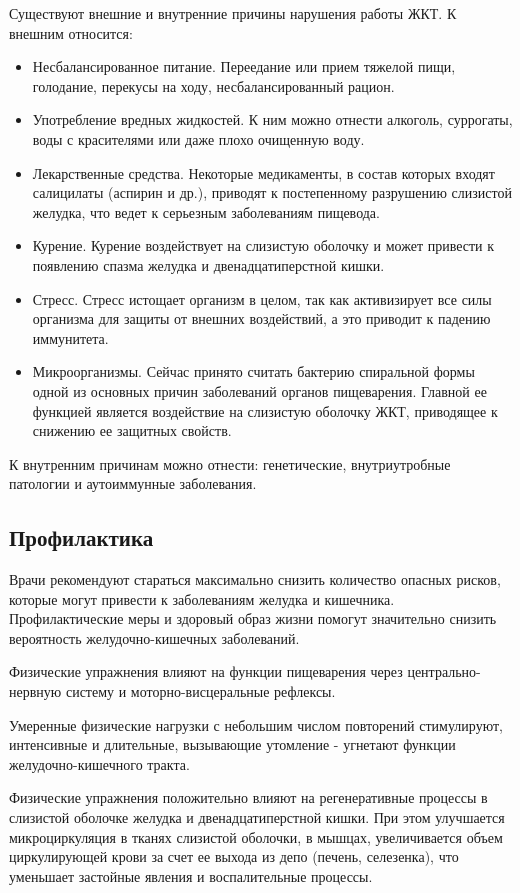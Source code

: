 \documentclass[a4paper]{article}
\begin{document}
    Существуют внешние и внутренние причины нарушения работы ЖКТ. К внешним относится:
    \begin{itemize}
        \item Несбалансированное питание. Переедание или прием тяжелой пищи, голодание, перекусы на ходу, несбалансированный рацион.
        \item Употребление вредных жидкостей. К ним можно отнести алкоголь, суррогаты, воды с красителями или даже плохо очищенную воду.
        \item Лекарственные средства. Некоторые медикаменты, в состав которых входят салицилаты (аспирин и др.), приводят к постепенному разрушению слизистой желудка, что ведет к серьезным заболеваниям пищевода.
        \item Курение. Курение воздействует на слизистую оболочку и может привести к появлению спазма желудка и двенадцатиперстной кишки. 
        \item Стресс. Стресс истощает организм в целом, так как активизирует все силы организма для защиты от внешних воздействий, а это приводит к падению иммунитета.
        \item Микроорганизмы.  Сейчас принято считать бактерию спиральной формы одной из основных причин заболеваний органов пищеварения. Главной ее функцией является воздействие на слизистую оболочку ЖКТ, приводящее к снижению ее защитных свойств.
    \end{itemize}

    К внутренним причинам можно отнести: генетические, внутриутробные патологии и аутоиммунные заболевания.

    \subsection{Профилактика}

    Врачи рекомендуют стараться максимально снизить количество опасных рисков, которые могут привести к заболеваниям желудка и кишечника. Профилактические меры и здоровый образ жизни помогут значительно снизить вероятность желудочно-кишечных заболеваний.

    Физические упражнения влияют на функции пищеварения через центрально-нервную систему и моторно-висцеральные рефлексы.

    Умеренные физические нагрузки с небольшим числом повторений стимулируют, интенсивные и длительные, вызывающие утомление - угнетают функции желудочно-кишечного тракта.

    Физические упражнения положительно влияют на регенеративные процессы в слизистой оболочке желудка и двенадцатиперстной кишки. При этом улучшается микроциркуляция в тканях слизистой оболочки, в мышцах, увеличивается объем циркулирующей крови за счет ее выхода из депо (печень, селезенка), что уменьшает застойные явления и воспалительные процессы.
\end{document}
